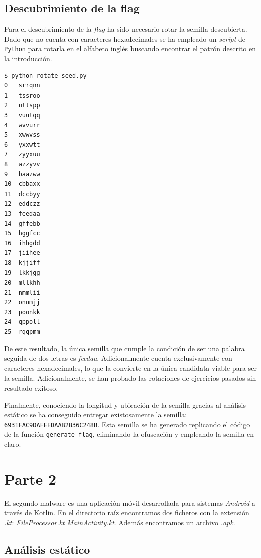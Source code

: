 \documentclass[]{article}
\begin{document}
\subsection{Descubrimiento de la flag}
\label{flag1}

Para el descubrimiento de la \textit{flag} ha sido necesario rotar la semilla
descubierta. Dado que no cuenta con caracteres hexadecimales se ha empleado un
\textit{script} de \texttt{Python} para rotarla en el alfabeto inglés buscando
encontrar el patrón descrito en la introducción.

\begin{lstlisting}[caption=Resultado de rotar la semilla en el alfabeto inglés]
$ python rotate_seed.py 
0	srrqnn
1	tssroo
2	uttspp
3	vuutqq
4	wvvurr
5	xwwvss
6	yxxwtt
7	zyyxuu
8	azzyvv
9	baazww
10	cbbaxx
11	dccbyy
12	eddczz
13	feedaa
14	gffebb
15	hggfcc
16	ihhgdd
17	jiihee
18	kjjiff
19	lkkjgg
20	mllkhh
21	nmmlii
22	onnmjj
23	poonkk
24	qppoll
25	rqqpmm
\end{lstlisting}

De este resultado, la única semilla que cumple la condición de ser una palabra
seguida de dos letras es \textit{feedaa}. Adicionalmente cuenta exclusivamente
con caracteres hexadecimales, lo que la convierte en
la única candidata viable para ser la semilla. Adicionalmente, se han
probado las rotaciones de ejercicios pasados sin resultado exitoso.

Finalmente, conociendo la longitud y ubicación de la semilla gracias al
análisis estático se ha conseguido entregar existosamente la semilla:
\texttt{6931FAC9DAFEEDAAB2B36C248B}. Esta semilla se ha generado replicando el
código de la función \texttt{generate\_flag}, eliminando la ofuscación y
empleando la semilla en claro.

\section{Parte 2}
\label{sec:type2}

El segundo malware es una aplicación móvil desarrollada para sistemas \textit{Android} a
través de Kotlin. En el directorio raíz encontramos dos ficheros con la
extensión \textit{.kt}: \textit{FileProcessor.kt} \textit{MainActivity.kt}.
Además encontramos un archivo \textit{.apk}.

\subsection{Análisis estático}
\label{subsec:analisis-estatico-2}
\end{document}
